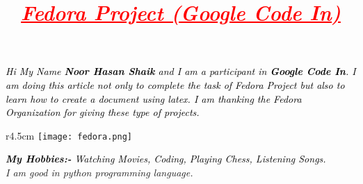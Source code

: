 \documentclass[12pt,a4paper]{article}
\title{\textcolor{red}{\textbf {\emph{\underline{\textbf{{\Huge Fedora Project (Google Code In)}}}}}}}
\date{\vspace{-10ex}}
\begin{document}
\maketitle
\thispagestyle{fancy}

\textit{\hspace{2ex} \LARGE{\textcolor{black}{Hi My Name \textbf{Noor Hasan Shaik} and I am a participant in \textbf{Google Code In}. I am doing this article not only to complete the task of Fedora Project but also to learn how to create a document using latex. I am thanking the Fedora Organization for giving these type of projects.\\ }}}

\begin{wrapfigure}{r}{4.5cm}
	\label{wrap-fig:1}
	\texttt{[image: fedora.png]}
\end{wrapfigure} 
 \textit{\hspace{2ex} \LARGE{\textcolor{black}{\textbf{My Hobbies:-} Watching Movies, Coding, Playing Chess, Listening Songs.\\}I am good in python programming language.\\}}
\end{document}
